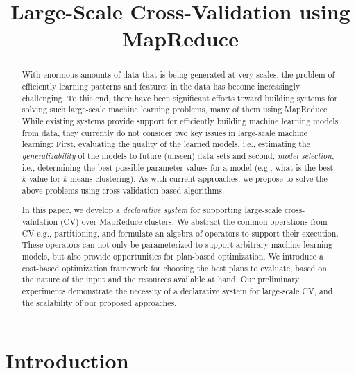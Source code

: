 \documentclass{vldb}
\author{
}
\date{}
\title{Large-Scale Cross-Validation using MapReduce}
\begin{document}
\maketitle

\begin{abstract}
With enormous amounts of data that is being generated at very scales, the
problem of efficiently learning patterns and features in the data has become
increasingly challenging. To this end, there have been significant efforts
toward building systems for solving such large-scale machine learning problems,
many of them using MapReduce. While existing systems provide support for
efficiently building machine learning models from data, they currently do not
consider two key issues in large-scale machine learning: First, evaluating the
quality of the learned models, i.e., estimating the {\em generalizability} of
the models to future (unseen) data sets and second, {\em model selection}, i.e.,
determining the best possible parameter values for a model (e.g., what is the
best $k$ value for $k$-means clustering). As with current approaches, we propose
to solve the above problems using cross-validation based algorithms.

In this paper, we develop a {\em declarative system} for supporting
large-scale cross-validation (CV) over MapReduce clusters. We abstract the
common operations from CV e.g., partitioning, and formulate an algebra of
operators to support their execution. These operators can not only be
parameterized to support arbitrary machine learning models, but also provide
opportunities for plan-based optimization. We introduce a cost-based
optimization framework for choosing the best plans to evaluate, based on the
nature of the input and the resources available at hand. Our preliminary
experiments demonstrate the necessity of a declarative system for large-scale
CV, and the scalability of our proposed approaches.
\end{abstract}

\section{Introduction}
\label{sec:introduction}
\end{document}
